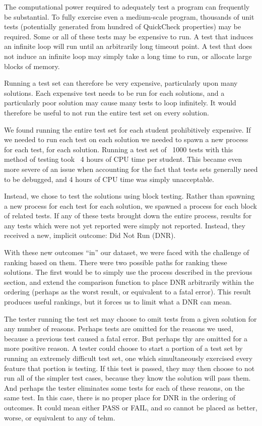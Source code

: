 \documentclass[11pt]{article}
\begin{document}
The computational power required to adequately test a program can frequently be substantial. To fully exercise even a medium-scale program, thousands of unit tests (potentially generated from hundred of QuickCheck properties) may be required. Some or all of these tests may be expensive to run. A test that induces an infinite loop will run until an arbitrarily long timeout point. A test that does not induce an infinite loop may simply take a long time to run, or allocate large blocks of memory.

Running a test set can therefore be very expensive, particularly upon many solutions. Each expensive test needs to be run for each solutions, and a particularly poor solution may cause many tests to loop infinitely. It would therefore be useful to not run the entire test set on every solution. 

We found running the entire test set for each student prohibitively expensive. If we needed to run each test on each solution we needed to spawn a new process for each test, for each solution. Running a test set of ~1000 tests with this method of testing took ~4 hours of CPU time per student. This became even more severe of an issue when accounting for the fact that tests sets generally need to be debugged, and 4 hours of CPU time was simply unacceptable.

Instead, we chose to test the solutions using block testing. Rather than spawning a new process for each test for each solution, we spawned a process for each block of related tests. If any of these tests brought down the entire process, results for any tests which were not yet reported were simply not reported. Instead, they received a new, implicit outcome: Did Not Run (DNR).

With these new outcomes ``in'' our dataset, we were faced with the challenge of ranking based on them. There were two possible paths for ranking these solutions. The first would be to simply use the process described in the previous section, and extend the comparison function to place DNR arbitrarily within the ordering (perhaps as the worst result, or equivalent to a fatal error). This result produces useful rankings, but it forces us to limit what a DNR can mean.

The tester running the test set may choose to omit tests from a given solution for any number of reasons. Perhaps tests are omitted for the reasons we used, because a previous test caused a fatal error. But perhaps thy are omitted for a more positive reason. A tester could choose to start a portion of a test set by running an extremely difficult test set, one which simultaneously exercised every feature that portion is testing. If this test is passed, they may then choose to not run all of the simpler test cases, because they know the solution will pass them. And perhaps the tester eliminates some tests for each of these reasons, on the same test. In this case, there is no proper place for DNR in the ordering of outcomes. It could mean either PASS or FAIL, and so cannot be placed as better, worse, or equivalent to any of tehm.
\end{document}
